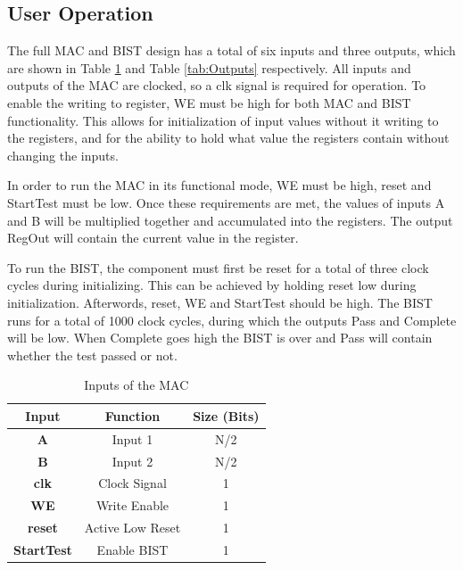 \documentclass[11pt]{article}
\begin{document}
	\subsection{User Operation}
		The full MAC and BIST design has a total of six inputs and three outputs, which are shown in Table \ref{tab:Inputs} and Table \ref{tab:Outputs} respectively. All inputs and outputs of the MAC are clocked, so a clk signal is required for operation. To enable the writing to register, WE must be high for both MAC and BIST functionality. This allows for initialization of input values without it writing to the registers, and for the ability to hold what value the registers contain without changing the inputs. 
		
		In order to run the MAC in its functional mode, WE must be high, reset and StartTest must be low. Once these requirements are met, the values of inputs A and B will be multiplied together and accumulated into the registers. The output RegOut will contain the current value in the register.
		
		To run the BIST, the component must first be reset for a total of three clock cycles during initializing. This can be achieved by holding reset low during initialization. Afterwords, reset, WE and StartTest should be high. The BIST runs for a total of 1000 clock cycles, during which the outputs Pass and Complete will be low. When Complete goes high the BIST is over and Pass will contain whether the test passed or not.
		
		\begin{table}[H]
			\centering
			\caption{Inputs of the MAC}
			\label{tab:Inputs}
			\begin{tabular}{|ccc|}
				\hline
				\textbf{}   \textbf{Input}      & \textbf{Function} &  \textbf{Size (Bits)} \\
				\hline
				\textbf{A}  & Input 1 & N/2          \\
				\textbf{B}  & Input 2 & N/2            \\ 
				\textbf{clk}  & Clock Signal & 1        \\ 
				\textbf{WE}  & Write Enable & 1           \\ 
				\textbf{reset}  & Active Low Reset & 1           \\ 
				\textbf{StartTest}  & Enable BIST & 1           \\ 
				\hline                     
			\end{tabular}
		\end{table}
		
\end{document}
